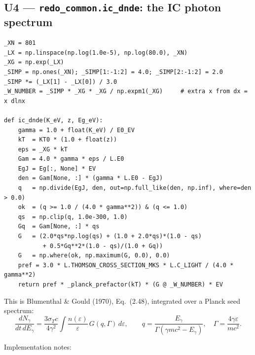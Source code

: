 \documentclass[11pt,a4paper]{article}
\newcommand{\code}[1]{\texttt{\small #1}}
\newcommand{\eps}{\varepsilon}
\newcommand{\Eg}{E_\gamma}
\begin{document}
\subsection*{U4 --- \code{redo\_common.ic\_dnde}: the IC photon spectrum}

\begin{lstlisting}
_XN = 801
_LX = np.linspace(np.log(1.0e-5), np.log(80.0), _XN)
_XG = np.exp(_LX)
_SIMP = np.ones(_XN); _SIMP[1:-1:2] = 4.0; _SIMP[2:-1:2] = 2.0
_SIMP *= (_LX[1] - _LX[0]) / 3.0
_W_NUMBER = _SIMP * _XG * _XG / np.expm1(_XG)     # extra x from dx = x dlnx

def ic_dnde(K_eV, z, Eg_eV):
    gamma = 1.0 + float(K_eV) / E0_EV
    kT  = KT0 * (1.0 + float(z))
    eps = _XG * kT
    Gam = 4.0 * gamma * eps / L.E0
    EgJ = Eg[:, None] * EV
    den = Gam[None, :] * (gamma * L.E0 - EgJ)
    q   = np.divide(EgJ, den, out=np.full_like(den, np.inf), where=den > 0.0)
    ok  = (q >= 1.0 / (4.0 * gamma**2)) & (q <= 1.0)
    qs  = np.clip(q, 1.0e-300, 1.0)
    Gq  = Gam[None, :] * qs
    G   = (2.0*qs*np.log(qs) + (1.0 + 2.0*qs)*(1.0 - qs)
           + 0.5*Gq**2*(1.0 - qs)/(1.0 + Gq))
    G   = np.where(ok, np.maximum(G, 0.0), 0.0)
    pref = 3.0 * L.THOMSON_CROSS_SECTION_MKS * L.C_LIGHT / (4.0 * gamma**2)
    return pref * _planck_prefactor(kT) * (G @ _W_NUMBER) * EV
\end{lstlisting}

This is Blumenthal \& Gould (1970), Eq.~(2.48), integrated over a Planck seed
spectrum:
\[
  \frac{dN_\gamma}{dt\,d\Eg} =
  \frac{3\sigma_T c}{4\gamma^2}\int \frac{n(\eps)}{\eps}\,G(q,\Gamma)\,d\eps,
  \qquad
  q = \frac{\Eg}{\Gamma(\gamma m c^2 - \Eg)},\quad
  \Gamma = \frac{4\gamma\eps}{m c^2}.
\]

Implementation notes:
\end{document}

